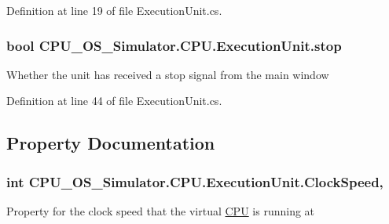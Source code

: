 Definition at line 19 of file Execution\+Unit.\+cs.

\hypertarget{class_c_p_u___o_s___simulator_1_1_c_p_u_1_1_execution_unit_aad508435c1085ec880b75723260b0439}{}
\subsubsection[{stop}]{\setlength{\rightskip}{0pt plus 5cm}bool C\+P\+U\+\_\+\+O\+S\+\_\+\+Simulator.\+C\+P\+U.\+Execution\+Unit.\+stop\hspace{0.3cm}{\ttfamily [private]}}\label{class_c_p_u___o_s___simulator_1_1_c_p_u_1_1_execution_unit_aad508435c1085ec880b75723260b0439}


Whether the unit has received a stop signal from the main window 



Definition at line 44 of file Execution\+Unit.\+cs.



\subsection{Property Documentation}
\hypertarget{class_c_p_u___o_s___simulator_1_1_c_p_u_1_1_execution_unit_ac34a0c232ee8d1996d29f5d8614556ab}{}
\subsubsection[{Clock\+Speed}]{\setlength{\rightskip}{0pt plus 5cm}int C\+P\+U\+\_\+\+O\+S\+\_\+\+Simulator.\+C\+P\+U.\+Execution\+Unit.\+Clock\+Speed\hspace{0.3cm}{\ttfamily [get]}, {\ttfamily [set]}}\label{class_c_p_u___o_s___simulator_1_1_c_p_u_1_1_execution_unit_ac34a0c232ee8d1996d29f5d8614556ab}


Property for the clock speed that the virtual \hyperlink{namespace_c_p_u___o_s___simulator_1_1_c_p_u}{C\+P\+U} is running at 



